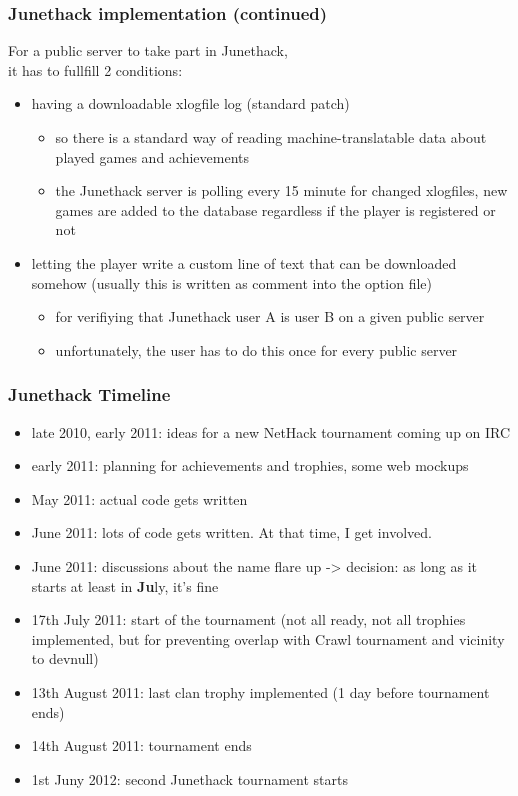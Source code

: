 \documentclass[handout]{beamer}
\begin{document}
\begin{frame}
\frametitle{Junethack implementation (continued)}
  For a public server to take part in Junethack,\\it has to fullfill 2 conditions:\pause
  \begin{itemize}[<+->]
    \item having a downloadable xlogfile log (standard patch)
    \begin{itemize}[<+->]
      \item so there is a standard way of reading machine-translatable data about played games and achievements
      \item the Junethack server is polling every 15 minute for changed xlogfiles, new games are added to the database regardless if the player is registered or not
    \end{itemize}
    \item letting the player write a custom line of text that can be downloaded somehow (usually this is written as comment into the option file)
    \begin{itemize}[<+->]
      \item for verifiying that Junethack user A is user B on a given public server
      \item unfortunately, the user has to do this once for every public server
    \end{itemize}
  \end{itemize}
\end{frame}

\begin{frame}
\frametitle{Junethack Timeline}
  \pause
  \begin{itemize}[<+->]
    \item late 2010, early 2011: ideas for a new NetHack tournament coming up on IRC
    \item early 2011: planning for achievements and trophies, some web mockups
    \item May 2011: actual code gets written
    \item June 2011: lots of code gets written. At that time, I get involved.
    \item June 2011: discussions about the name flare up -> decision: as long as it starts at least in \textbf{Ju}ly, it's fine
    \item 17th July 2011: start of the tournament (not all ready, not all trophies implemented, but for preventing overlap with Crawl tournament and vicinity to devnull)
    \item 13th August 2011: last clan trophy implemented (1 day before tournament ends)
    \item 14th August 2011: tournament ends
    \item 1st Juny 2012: second Junethack tournament starts
  \end{itemize}
\end{frame}
\end{document}
